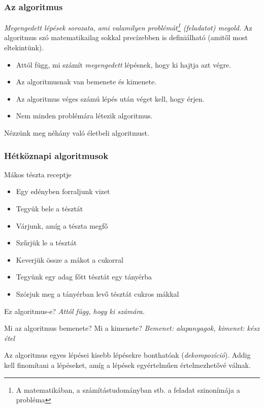 \documentclass[
	11pt, %
]{beamer}
\begin{document}
\begin{frame}
  \frametitle{Az algoritmus}

  \emph{Megengedett lépések sorozata, ami valamilyen problémát\footnote{A matematikában, a számítástudományban stb. a feladat szinonímája a probléma} (feladatot) megold.} Az algoritmus szó matematikailag sokkal precízebben is definiálható (amitől most eltekintünk).

  \begin{itemize}
    \item{Attól függ, mi számít \emph{megengedett} lépésnek, hogy ki hajtja azt végre.}
    \item{Az algoritmusnak van bemenete és kimenete.}
    \item{Az algoritmus véges számú lépés után véget kell, hogy érjen.}
    \item{Nem minden problémára létezik algoritmus.}
  \end{itemize}

  \bigskip

  Nézzünk meg néhány való életbeli algoritmust.

\end{frame}

\begin{frame}
  \frametitle{Hétköznapi algoritmusok}

  Mákos tészta receptje

  \begin{itemize}
    \item{Egy edényben forraljunk vizet}
    \item{Tegyük bele a tésztát}
    \item{Várjunk, amíg a tészta megfő}
    \item{Szűrjük le a tésztát}
    \item{Keverjük össze a mákot a cukorral}
    \item{Tegyünk egy adag főtt tésztát egy tányérba}
    \item{Szórjuk meg a tányérban levő tésztát cukros mákkal}
  \end{itemize}

  Ez algoritmus-e? \emph{Attól függ, hogy ki számára.}

  Mi az algoritmus bemenete? Mi a kimenete? \emph{Bemenet: alapanyagok, kimenet: kész étel}

  Az algoritmus egyes lépései kisebb lépésekre bonthatóak (\emph{dekompozíció}). Addig kell finomítani
  a lépéseket, amíg a lépések egyértelműen értelmezhetővé válnak.

\end{frame}
\end{document}
